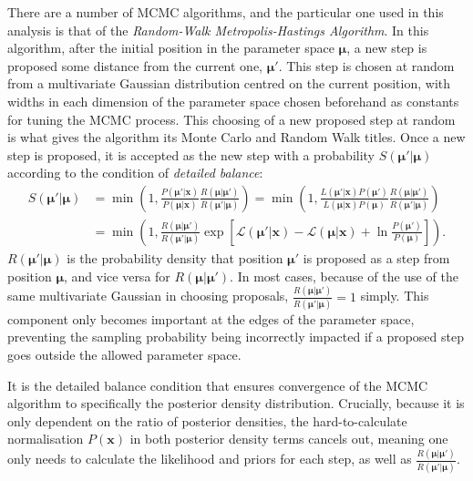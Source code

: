 There are a number of MCMC algorithms, and the particular one used in this analysis is that of the \textit{Random-Walk Metropolis-Hastings Algorithm}. In this algorithm, after the initial position in the parameter space $\bm{\mu}$, a new step is proposed some distance from the current one, $\bm{\mu}'$. This step is chosen at random from a multivariate Gaussian distribution centred on the current position, with widths in each dimension of the parameter space chosen beforehand as constants for tuning the MCMC process. This choosing of a new proposed step at random is what gives the algorithm its Monte Carlo and Random Walk titles. Once a new step is proposed, it is accepted as the new step with a probability $S\left(\bm{\mu}'|\bm{\mu}\right)$ according to the condition of \textit{detailed balance}:
\begin{align}
    S\left(\bm{\mu}'|\bm{\mu}\right) &= 
    \min{\left(
        1,
        \frac{P\left(\bm{\mu}'|\bm{x}\right)}{P\left(\bm{\mu}|\bm{x}\right)}
        \frac{R\left(\bm{\mu}|\bm{\mu}'\right)}{R\left(\bm{\mu}'|\bm{\mu}\right)}
        \right)
        } = 
    \min{\left(
        1,
        \frac{L\left(\bm{\mu}'|\bm{x}\right)P\left(\bm{\mu}'\right)}{L\left(\bm{\mu}|\bm{x}\right)P\left(\bm{\mu}\right)}
        \frac{R\left(\bm{\mu}|\bm{\mu}'\right)}{R\left(\bm{\mu}'|\bm{\mu}\right)}
        \right)
    }\nonumber\\
    &= \min{\left(
        1,
        \frac{R\left(\bm{\mu}|\bm{\mu}'\right)}{R\left(\bm{\mu}'|\bm{\mu}\right)}
        \exp{\left[\mathcal{L}\left(\bm{\mu}'|\bm{x}\right)-\mathcal{L}\left(\bm{\mu}|\bm{x}\right)+\ln{\frac{P\left(\bm{\mu}'\right)}{P\left(\bm{\mu}\right)}}\right]}
        \right)
    }.
\end{align}
$R\left(\bm{\mu}'|\bm{\mu}\right)$ is the probability density that position $\bm{\mu}'$ is proposed as a step from position $\bm{\mu}$, and vice versa for $R\left(\bm{\mu}|\bm{\mu}'\right)$. In most cases, because of the use of the same multivariate Gaussian in choosing proposals, $\frac{R\left(\bm{\mu}|\bm{\mu}'\right)}{R\left(\bm{\mu}'|\bm{\mu}\right)} = 1$ simply. This component only becomes important at the edges of the parameter space, preventing the sampling probability being incorrectly impacted if a proposed step goes outside the allowed parameter space.

It is the detailed balance condition that ensures convergence of the MCMC algorithm to specifically the posterior density distribution. Crucially, because it is only dependent on the ratio of posterior densities, the hard-to-calculate normalisation $P\left(\bm{x}\right)$ in both posterior density terms cancels out, meaning one only needs to calculate the likelihood and priors for each step, as well as $\frac{R\left(\bm{\mu}|\bm{\mu}'\right)}{R\left(\bm{\mu}'|\bm{\mu}\right)}$.

